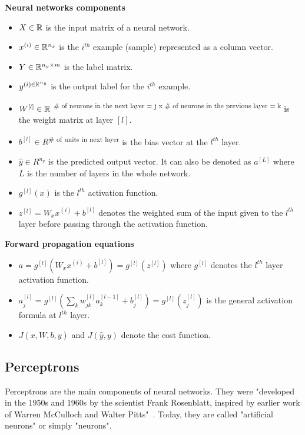 \noindent \textbf{Neural networks components}
\begin{itemize}
\item $X\in \mathbb{R}$ is the input matrix of a neural network.
\item $x^{(i)} \in \mathbb{R}^{n_{x}}$ is the $i^{th}$ example (sample) represented as a column vector.
\item $Y \in \mathbb{R}^{n_{y} \times m}$ is the label matrix.
\item $y^{(i) \in \mathbb{R}^{n_{y}}}$ is the output label for the $i^{th}$ example.
\item $W^{[l]} \in \mathbb{R}$ \textsuperscript{\# of neurons in the next layer = j  x \# of neurons in the previous layer = k} is the weight matrix at layer $[l]$.
\item $b^{[l]} \in R$\textsuperscript{\# of units in next layer} is the bias vector at the $l^{th}$ layer.
\item $\hat{y} \in R^{n_{y}}$ is the predicted output vector. It can also be denoted as $a^{[L]}$ where $L$ is the number of layers in the whole network.
\item $g^{[l]}(x)$ is the $l^{th}$ activation function.  
\item $z^{[l]} = W_{x}x^{(i)} + b^{[l]}$ denotes the weighted sum of the input given to the $l^{th}$ layer before passing through the activation function.\\
\end{itemize}

\noindent \textbf{Forward propagation equations}
\begin{itemize}
\item $a = g^{[l]}(W_{x}x^{(i)} + b^{[l]}) = g^{[l]}(z^{[l]})$ where $g^{[l]}$ denotes the $l^{th}$ layer activation function.
\item $a_{j}^{[l]} = g^{[l]} (\sum_{k} w_{jk}^{[l]}a_{k}^{[l-1]} + b_{j}^{[l]}) = g^{[l]} (z_{j}^{[l]}) $ is the general activation formula at $l^{th}$ layer.
\item $J(x, W, b, y)$ and $J(\hat{y}, y)$ denote the cost function.
\end{itemize}

\subsection{Perceptrons}
\label{perceptron}
\setlength{\marginparwidth}{3cm}\leavevmode {}Perceptrons are the main components of neural networks. They were "developed in the 1950s and 1960s by the scientist Frank Rosenblatt, inspired by earlier work of Warren McCulloch and Walter Pitts"~\cite{13}. Today, they are called "artificial neurons" or simply "neurons".

